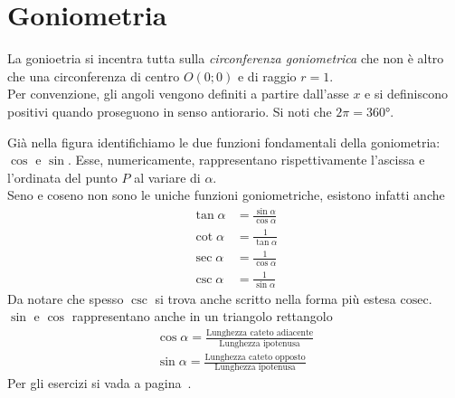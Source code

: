
\section{Goniometria}\label{sec:goniometria}
La gonioetria si incentra tutta sulla \emph{circonferenza goniometrica} che non è altro che una
circonferenza di centro $O(0;0)$ e di raggio $r=1$.\\
Per convenzione, gli angoli vengono definiti a partire dall'asse $x$ e si definiscono positivi quando
proseguono in senso antiorario. Si noti che $2\pi = \ang{360}$.
\begin{center}
\end{center}
Già nella figura identifichiamo le due funzioni fondamentali della goniometria: $\cos$ e $\sin$. Esse,
numericamente, rappresentano rispettivamente l'ascissa e l'ordinata del punto $P$ al variare di 
$\alpha$.\\
Seno e coseno non sono le uniche funzioni goniometriche, esistono infatti anche
\begin{align*}
  \tan\alpha &= \frac{\sin\alpha}{\cos\alpha}\\
  \cot\alpha &= \frac{1}{\tan\alpha}\\
  \sec\alpha &= \frac{1}{\cos\alpha}\\
  \csc\alpha &= \frac{1}{\sin\alpha}
\end{align*}
Da notare che spesso $\csc$ si trova anche scritto nella forma più estesa $\mathrm{cosec}$.\\
$\sin$ e $\cos$ rappresentano anche in un triangolo rettangolo
\begin{gather*}
  \cos\alpha = \frac{\text{Lunghezza cateto adiacente}}{\text{Lunghezza ipotenusa}}\\
  \sin\alpha = \frac{\text{Lunghezza cateto opposto}}{\text{Lunghezza ipotenusa}}
\end{gather*}
Per gli esercizi si vada a pagina~\pageref{ex:goniometria}.

